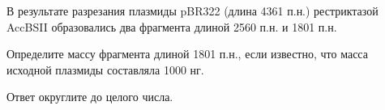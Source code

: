 
В результате разрезания плазмиды pBR322 (длина 4361 п.н.) рестриктазой AccBSII образовались два фрагмента длиной  2560 п.н. и 1801 п.н.

Определите массу фрагмента длиной 1801 п.н., если известно, что масса исходной плазмиды составляла 1000 нг.

Ответ округлите до целого числа. 